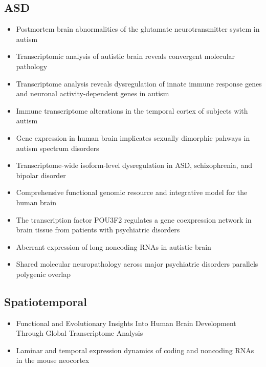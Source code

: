 \subsection{ASD}
\begin{itemize}
    \item Postmortem brain abnormalities of the glutamate neurotransmitter system in autism \cite{purcell_postmortem_2001}
    \item Transcriptomic analysis of autistic brain reveals convergent molecular pathology \cite{voineagu_transcriptomic_2011}
    \item Transcriptome analysis reveals dysregulation of innate immune response genes and neuronal activity-dependent genes in autism \cite{gupta_transcriptome_2014}
    \item Immune transcriptome alterations in the temporal cortex of subjects with autism \cite{garbett_immune_2008}
    \item Gene expression in human brain implicates sexually dimorphic pahways in autism spectrum disorders \cite{werling_gene_2016}
    \item Transcriptome-wide isoform-level dysregulation in ASD, schizophrenia, and bipolar disorder \cite{gandal_transcriptome-wide_2018}
    \item Comprehensive functional genomic resource and integrative model for the human brain \cite{wang_comprehensive_2018}
    \item The transcription factor POU3F2 regulates a gene coexpression network in brain tissue from patients with psychiatric disorders \cite{chen_transcription_2018}
    \item Aberrant expression of long noncoding RNAs in autistic brain \cite{ziats_aberrant_2013}
    \item Shared molecular neuropathology across major psychiatric disorders parallels polygenic overlap \cite{gandal_shared_2018}
\end{itemize}

\subsection{Spatiotemporal}
\begin{itemize}
    \item Functional and Evolutionary Insights Into Human Brain Development Through Global Transcriptome Analysis \cite{johnson_functional_2009}
    \item Laminar and temporal expression dynamics of coding and noncoding RNAs in the mouse neocortex \cite{fertuzinhos_laminar_2014}
\end{itemize}

